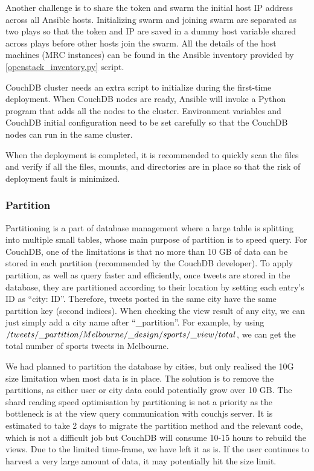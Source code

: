 Another challenge is to share the token and swarm the initial host IP address across all Ansible hosts. Initializing swarm and joining swarm are separated as two plays so that the token and IP are saved in a dummy host variable shared across plays before other hosts join the swarm. All the details of the host machines (MRC instances) can be found in the Ansible inventory provided by \href{https://docs.ansible.com/ansible/latest/user_guide/intro_dynamic_inventory.html}{[openstack\_inventory.py]} script.

CouchDB cluster needs an extra script to initialize during the first-time deployment. When CouchDB nodes are ready, Ansible will invoke a Python program that adds all the nodes to the cluster. Environment variables and CouchDB initial configuration need to be set carefully so that the CouchDB nodes can run in the same cluster.

When the deployment is completed, it is recommended to quickly scan the files and verify if all the files, mounts, and directories are in place so that the risk of deployment fault is minimized.

\subsubsection{Partition}

Partitioning is a part of database management where a large table is splitting into multiple small tables, whose main purpose of partition is to speed query. For CouchDB, one of the limitations is that no more than 10 GB of data can be stored in each partition (recommended by the CouchDB developer). To apply partition, as well as query faster and efficiently, once tweets are stored in the database, they are partitioned according to their location by setting each entry’s ID as “{city}: ID”. Therefore, tweets posted in the same city have the same partition key (second indices).  When checking the view result of any city, we can just simply add a city name after “\_partition”. For example, by using $/tweets/\_partition/Melbourne/\_design/sports/\_view\\/total$, we can get the total number of sports tweets in Melbourne. 

We had planned to partition the database by cities, but only realised the 10G size limitation when most data is in place. The solution is to remove the partitions, as either user or city data could potentially grow over 10 GB. The shard reading speed optimisation by partitioning is not a priority as the bottleneck is at the view query  communication with couchjs server. It is estimated to take 2 days to migrate the partition method and the relevant code, which is not a difficult job but CouchDB will consume 10-15 hours to rebuild the views. Due to the limited time-frame, we have left it as is. If the user continues to harvest a very large amount of data, it may potentially hit the size limit.

